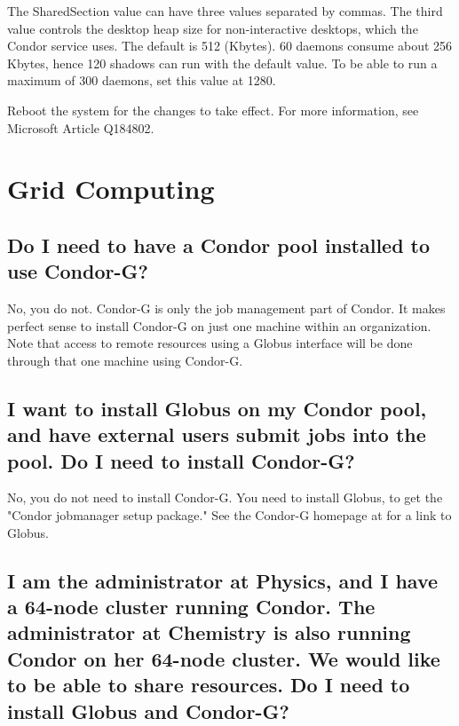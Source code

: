 The SharedSection value can have three values separated by commas.
The third value controls the desktop heap size for non-interactive desktops,
which the Condor service uses.
The default is 512 (Kbytes).
60  daemons consume about 256 Kbytes,
hence 120 shadows can run with the default value.
To be able to run a maximum of 300  daemons,
set this value at 1280.

Reboot the system for the changes to take effect.
For more information,
see Microsoft Article Q184802.

\section{Grid Computing}


\subsection*{Do I need to have a Condor pool installed to use Condor-G?}
No, you do not.
Condor-G is only the job management part of Condor.
It makes perfect sense to install Condor-G on just one machine
within an organization.
Note that access to remote resources using a Globus interface
will be done through that one machine using Condor-G.

\subsection*{I want to install Globus on my Condor pool, and have external users submit jobs into the pool. Do I need to install Condor-G?}

No, you do not need to install Condor-G.
You need to install Globus,
to get the "Condor jobmanager setup package."
See the Condor-G
homepage at 
for a link to Globus.

\subsection*{I am the administrator at Physics, and I have a 64-node cluster
running Condor.
The administrator at Chemistry is also running Condor on her 64-node cluster.
We would like to be able to share resources.
Do I need to install Globus and Condor-G?}

